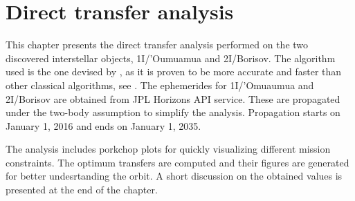 \chapter{Direct transfer analysis}
\label{ch:direct-transfer}

This chapter presents the direct transfer analysis performed on the two
discovered interstellar objects, 1I/'Oumuamua and 2I/Borisov. The algorithm used
is the one devised by \cite{izzo2015}, as it is proven to be more accurate and
faster than other classical algorithms, see \cite{martinez2021}. The ephemerides
for 1I/'Omuaumua and 2I/Borisov are obtained from JPL Horizons API service.
These are propagated under the two-body assumption to simplify the analysis.
Propagation starts on January 1, 2016 and ends on January 1, 2035.

The analysis includes porkchop plots for quickly visualizing different mission
constraints. The optimum transfers are computed and their figures are generated
for better undesrtanding the orbit. A short discussion on the obtained values is
presented at the end of the chapter.





